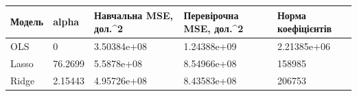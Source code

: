 
\Needspace{19.2pt}


\Needspace{69pt}
\begingroup\fontsize{7.5}{9.5}\selectfont\setlength{\tabcolsep}{2.5mm}\renewcommand{\arraystretch}{1.12}\par\noindent\begin{tabular}{|lllll|}
\hline
Модель & alpha & Навчальна MSE, дол.\textasciicircum{}2 & Перевірочна MSE, дол.\textasciicircum{}2 & Норма коефіцієнтів \\
\hline
OLS & 0 & 3.50384e+08 & 1.24388e+09 & 2.21385e+06 \\
Lasso & 76.2699 & 5.5878e+08 & 8.54966e+08 & 158985 \\
Ridge & 2.15443 & 4.95726e+08 & 8.43583e+08 & 206753 \\
\hline
\end{tabular}
\par\endgroup


\Needspace{46.8pt}


